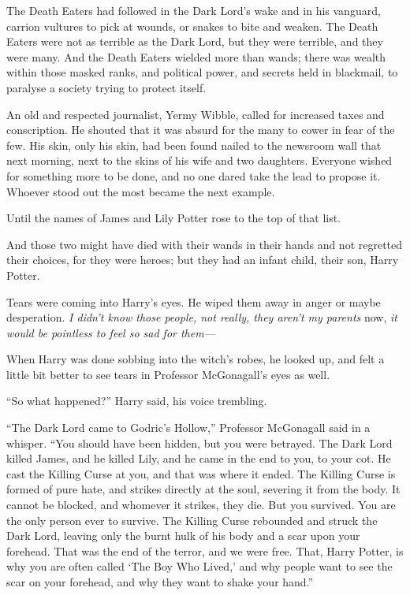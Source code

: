 The Death Eaters had followed in the Dark Lord’s wake and in his vanguard,
carrion vultures to pick at wounds, or snakes to bite and weaken. The Death
Eaters were not as terrible as the Dark Lord, but they were terrible, and they
were many. And the Death Eaters wielded more than wands; there was wealth
within those masked ranks, and political power, and secrets held in blackmail,
to paralyse a society trying to protect itself.

An old and respected journalist, Yermy Wibble, called for increased taxes and
conscription. He shouted that it was absurd for the many to cower in fear of
the few. His skin, only his skin, had been found nailed to the newsroom wall
that next morning, next to the skins of his wife and two daughters. Everyone
wished for something more to be done, and no one dared take the lead to propose
it. Whoever stood out the most became the next example.

Until the names of James and Lily Potter rose to the top of that list.

And those two might have died with their wands in their hands and not regretted
their choices, for they were heroes; but they had an infant
child, their son, Harry Potter.

Tears were coming into Harry’s eyes. He wiped them away in anger or maybe
desperation. \emph{I didn’t know those people, not really, they aren’t my
parents} now, \emph{it would be pointless to feel so sad for them—}

When Harry was done sobbing into the witch’s robes, he looked up, and felt a
little bit better to see tears in Professor McGonagall’s eyes as well.

“So what happened?” Harry said, his voice trembling.

“The Dark Lord came to Godric’s Hollow,” Professor McGonagall said in a
whisper. “You should have been hidden, but you were betrayed. The Dark Lord
killed James, and he killed Lily, and he came in the end to you, to your cot.
He cast the Killing Curse at you, and that was where it ended. The Killing
Curse is formed of pure hate, and strikes directly at the soul, severing it
from the body. It cannot be blocked, and whomever it strikes, they die. But you
survived. You are the only person ever to survive. The Killing Curse rebounded
and struck the Dark Lord, leaving only the burnt hulk of his body and a scar
upon your forehead. That was the end of the terror, and we were free. That,
Harry Potter, is why you are often called ‘The Boy Who Lived,’
and why people want to see the scar on your forehead, and why they
want to shake your hand.”

